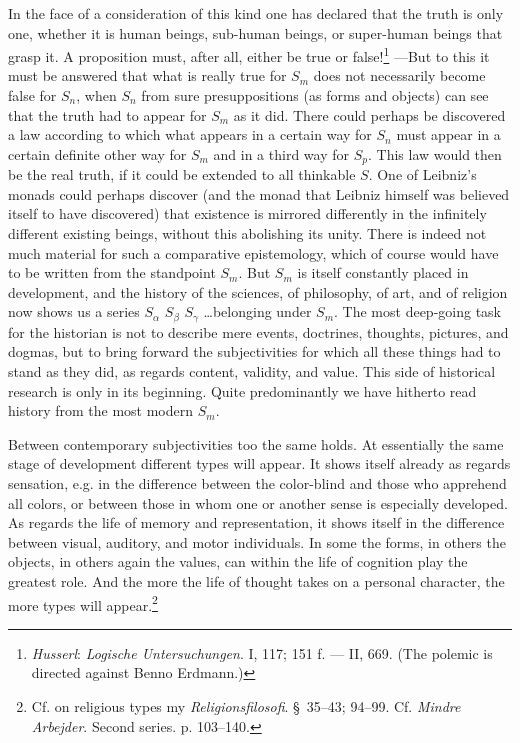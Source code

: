 \documentclass[12pt,a4paper]{book}
\newcommand{\opage}[1]{\marginnote{\footnotesize\textit{[#1]}}}
\begin{document}
\opage{304}In the face of a consideration of this kind one has declared that the truth is only one,
whether it is human beings, sub-human beings, or super-human beings that grasp it. A
proposition must, after all, either be true or false!\footnote{\emph{Husserl}: \emph{Logische
Untersuchungen}. I, 117; 151 f. --- II, 669. (The polemic is directed against Benno Erdmann.)}
---But to this it must be answered that what is really true for $S_m$ does not necessarily
become false for $S_n$, when $S_n$ from sure presuppositions (as forms and objects) can see
that the truth had to appear for $S_m$ as it did. There could perhaps be discovered a law
according to which what appears in a certain way for $S_n$ must appear in a certain definite
other way for $S_m$ and in a third way for $S_p$. This law would then be the real truth, if it
could be extended to all thinkable $S$. One of Leibniz's monads could perhaps discover (and the
monad that Leibniz himself was believed itself to have discovered) that existence is mirrored
differently in the infinitely different existing beings, without this abolishing its unity.
There is indeed not much material for such a comparative epistemology, which of course would
have to be written from the standpoint $S_m$. But $S_m$ is itself constantly placed in
development, and the history of the sciences, of philosophy, of art, and of religion now shows
us a series $S_\alpha$ $S_\beta$ $S_\gamma$ \ldots belonging under $S_m$. The most deep-going
task for the historian is not to describe mere events, doctrines, thoughts, pictures, and
dogmas, but to bring forward the subjectivities for which all these things had to stand as they
did, as regards content, validity, and value. This side of historical research is only in its
beginning. Quite predominantly we have hitherto read history from the most modern $S_m$.

Between contemporary subjectivities too the same holds. At essentially the same stage of
development different types will appear. It shows itself already as regards sensation, e.g. in
the difference between the color-blind and those who apprehend all colors, or between those in
whom one or another sense is especially developed. As regards the life of memory and
representation, it shows itself in the difference between \opage{305}visual, auditory, and motor
individuals. In some the forms, in others the objects, in others again the values, can within
the life of cognition play the greatest role. And the more the life of thought takes on a
personal character, the more types will appear.\footnote{Cf. on religious types my
\emph{Religionsfilosofi}. \S\ 35--43; 94--99. Cf. \emph{Mindre Arbejder}. Second series. p.
103--140.}
\end{document}
